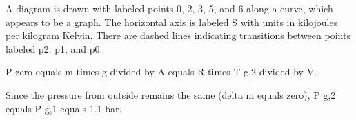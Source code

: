 A diagram is drawn with labeled points 0, 2, 3, 5, and 6 along a curve, which appears to be a graph. The horizontal axis is labeled S with units in kilojoules per kilogram Kelvin. There are dashed lines indicating transitions between points labeled p2, p1, and p0.

P zero equals m times g divided by A equals R times T g,2 divided by V.

Since the pressure from outside remains the same (delta m equals zero), P g,2 equals P g,1 equals 1.1 bar.